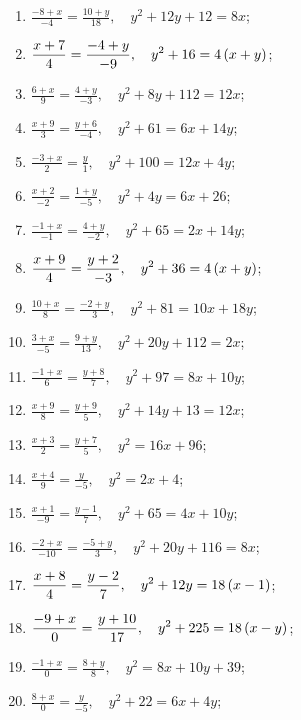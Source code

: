 	\begin{enumerate}
		\setcounter{enumi}{\value{tasks}}

			\item \( \displaystyle \frac{-8+x}{-4} = \frac{10+y}{18}, \quad y^2 + 12 y + 12 = 8 x \);
			\item \( \displaystyle \frac{x+7}{4} = \frac{-4+y}{-9}, \quad y^2 + 16 = 4 \left( x + y \right) \);
			\item \( \displaystyle \frac{6+x}{9} = \frac{4+y}{-3}, \quad y^2 + 8 y + 112 = 12 x \);
			\item \( \displaystyle \frac{x+9}{3} = \frac{y+6}{-4}, \quad y^2 + 61 = 6 x + 14 y \);
			\item \( \displaystyle \frac{-3+x}{2} = \frac{y}{1}, \quad y^2 + 100 = 12 x + 4 y \);
			\item \( \displaystyle \frac{x+2}{-2} = \frac{1+y}{-5}, \quad y^2 + 4 y = 6 x + 26 \);
			\item \( \displaystyle \frac{-1+x}{-1} = \frac{4+y}{-2}, \quad y^2 + 65 = 2 x + 14 y \);
			\item \( \displaystyle \frac{x+9}{4} = \frac{y+2}{-3}, \quad y^2 + 36 = 4 \left( x + y \right) \);
			\item \( \displaystyle \frac{10+x}{8} = \frac{-2+y}{3}, \quad y^2 + 81 = 10 x + 18 y \);
			\item \( \displaystyle \frac{3+x}{-5} = \frac{9+y}{13}, \quad y^2 + 20 y + 112 = 2 x \);
			\item \( \displaystyle \frac{-1+x}{6} = \frac{y+8}{7}, \quad y^2 + 97 = 8 x + 10 y \);
			\item \( \displaystyle \frac{x+9}{8} = \frac{y+9}{5}, \quad y^2 + 14 y + 13 = 12 x \);
			\item \( \displaystyle \frac{x+3}{2} = \frac{y+7}{5}, \quad y^2 = 16 x + 96 \);
			\item \( \displaystyle \frac{x+4}{9} = \frac{y}{-5}, \quad y^2 = 2x + 4 \);
			\item \( \displaystyle \frac{x+1}{-9} = \frac{y-1}{7}, \quad y^2 + 65 = 4 x + 10 y \);
			\item \( \displaystyle \frac{-2+x}{-10} = \frac{-5+y}{3}, \quad y^2 + 20 y + 116 = 8 x \);
			\item \( \displaystyle \frac{x+8}{4} = \frac{y-2}{7}, \quad y^2 + 12 y = 18 \left( x - 1 \right) \);
			\item \( \displaystyle \frac{-9+x}{0} = \frac{y+10}{17}, \quad y^2 + 225 = 18 \left( x - y \right) \);
			\item \( \displaystyle \frac{-1+x}{0} = \frac{8+y}{8}, \quad y^2 = 8 x + 10 y + 39 \);
			\item \( \displaystyle \frac{8+x}{0} = \frac{y}{-5}, \quad y^2 + 22 = 6 x + 4 y \);

		\setcounter{tasks}{\value{enumi}}
	\end{enumerate}

